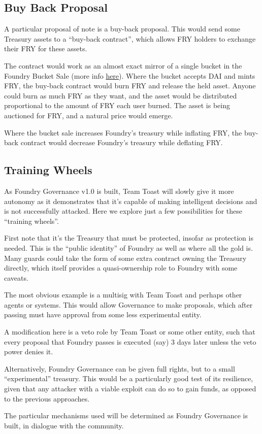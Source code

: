 \documentclass{article}
\begin{document}
\subsection{Buy Back Proposal} \label{buy-back}

A particular proposal of note is a buy-back proposal. This would send some Treasury assets to a ``buy-back contract'', which allows FRY holders to exchange their FRY for these assets.

The contract would work as an almost exact mirror of a single bucket in the Foundry Bucket Sale (more info \href{https://foundrydao.com/faq/#about-the-token-sale}{here}). Where the bucket accepts DAI and mints FRY, the buy-back contract would burn FRY and release the held asset. Anyone could burn as much FRY as they want, and the asset would be distributed proportional to the amount of FRY each user burned. The asset is being auctioned for FRY, and a natural price would emerge.

Where the bucket sale increases Foundry's treasury while inflating FRY, the buy-back contract would decrease Foundry's treasury while deflating FRY.

\subsection{Training Wheels} \label{training-wheels}

As Foundry Governance v1.0 is built, Team Toast will slowly give it more autonomy as it demonstrates that it's capable of making intelligent decisions and is not successfully attacked. Here we explore just a few possibilities for these ``training wheels''.

First note that it's the Treasury that must be protected, insofar as protection is needed. This is the ``public identity'' of Foundry as well as where all the gold is. Many guards could take the form of some extra contract owning the Treasury directly, which itself provides a quasi-ownership role to Foundry with some caveats.

The most obvious example is a multisig with Team Toast and perhaps other agents or systems. This would allow Governance to make proposals, which after passing must have approval from some less experimental entity.

A modification here is a veto role by Team Toast or some other entity, such that every proposal that Foundry passes is executed (say) 3 days later unless the veto power denies it.

Alternatively, Foundry Governance can be given full rights, but to a small ``experimental'' treasury. This would be a particularly good test of its resilience, given that any attacker with a viable exploit can do so to gain funds, as opposed to the previous approaches.

The particular mechanisms used will be determined as Foundry Governance is built, in dialogue with the community.
\end{document}
